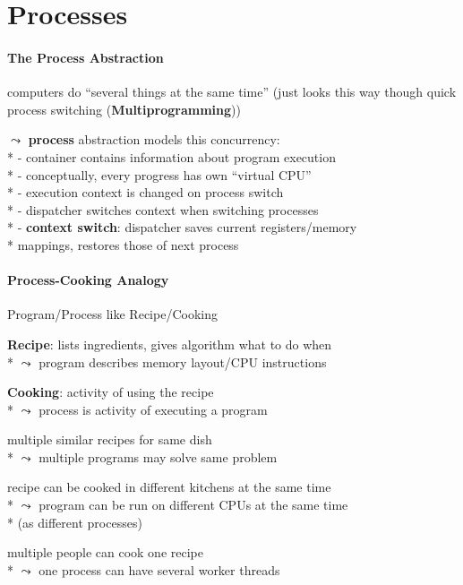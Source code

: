 \section{Processes}

\paragraph{The Process Abstraction}
\begin{items}
	\item computers do "`several things at the same time"' (just looks this way though quick process switching (\textbf{Multiprogramming}))
	\item \( \leadsto \) \textbf{process} abstraction models this concurrency: \\*
		- container contains information about program execution \\*
		- conceptually, every progress has own "`virtual CPU"' \\*
		- execution context is changed on process switch \\*
		- dispatcher switches context when switching processes \\*
		- \textbf{context switch}: dispatcher saves current registers/memory \\* \phantom{-} mappings, restores those of next process
\end{items}

\paragraph{Process-Cooking Analogy}
\begin{items}
	\item Program/Process like Recipe/Cooking
	\item \textbf{Recipe}: lists ingredients, gives algorithm what to do when \\*
		\( \leadsto \) program describes memory layout/CPU instructions
	\item \textbf{Cooking}: activity of using the recipe \\*
		\( \leadsto \) process is activity of executing a program
	\item multiple similar recipes for same dish \\*
		\( \leadsto \) multiple programs may solve same problem
	\item recipe can be cooked in different kitchens at the same time \\*
		\( \leadsto \) program can be run on different CPUs at the same time \\* \phantom{\( \leadsto \)} (as different processes)
	\item multiple people can cook one recipe \\*
		\( \leadsto \) one process can have several worker threads
\end{items}

